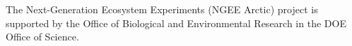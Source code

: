 The Next-Generation Ecosystem Experiments (NGEE Arctic) project is
supported by the Office of Biological and Environmental Research in the
DOE Office of Science.
